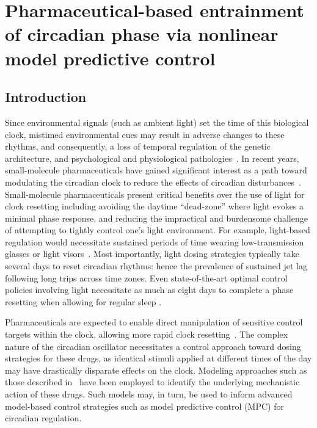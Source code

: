 \chapter{Pharmaceutical-based entrainment of circadian phase via nonlinear model predictive control}


\section{Introduction}

Since environmental signals (such as ambient light) set the time of this biological clock, mistimed environmental cues may result in adverse changes to these rhythms, and consequently, a loss of temporal regulation of the genetic architecture, and psychological and physiological pathologies~\cite{Marquie2015}.
In recent years, small-molecule pharmaceuticals have gained significant interest as a path toward modulating the circadian clock to reduce the effects of circadian disturbances~\cite{Hirota2010, Hirota2012a}.
Small-molecule pharmaceuticals present critical benefits over the use of light for clock resetting including avoiding the daytime ``dead-zone'' where light evokes a minimal phase response, and reducing the impractical and burdensome challenge of attempting to tightly control one's light environment.
For example, light-based regulation would necessitate sustained periods of time wearing low-transmission glasses or light visors~\cite{Serkh2014}.
Most importantly, light dosing strategies typically take several days to reset circadian rhythms: hence the prevalence of sustained jet lag following long trips across time zones.
Even state-of-the-art optimal control policies involving light necessitate as much as eight days to complete a phase resetting when allowing for regular sleep \cite{Julius2017}.

Pharmaceuticals are expected to enable direct manipulation of sensitive control targets within the clock, allowing more rapid clock resetting~\cite{Bagheri2008a}.
The complex nature of the circadian oscillator necessitates a control approach toward dosing strategies for these drugs, as identical stimuli applied at different times of the day may have drastically disparate effects on the clock.
Modeling approaches such as those described in~\cite{StJohn2014a} have been employed to identify the underlying mechanistic action of these drugs.
Such models may, in turn, be used to inform advanced model-based control strategies such as model predictive control (MPC) for circadian regulation.

